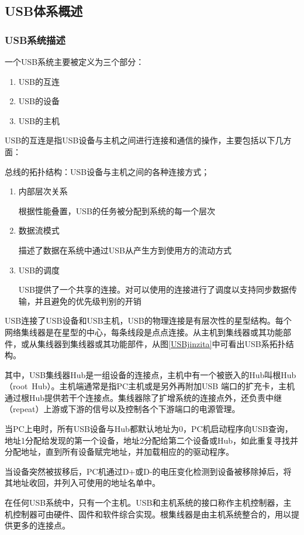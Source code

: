\subsection{USB体系概述}
\subsubsection{USB系统描述}
一个USB系统主要被定义为三个部分：
\begin{enumerate}
\item USB的互连
\item USB的设备
\item USB的主机
\end{enumerate}

USB的互连是指USB设备与主机之间进行连接和通信的操作，主要包括以下几方面： 

总线的拓扑结构：USB设备与主机之间的各种连接方式； 

\begin{enumerate}
\item 内部层次关系

根据性能叠置，USB的任务被分配到系统的每一个层次
\item 数据流模式

描述了数据在系统中通过USB从产生方到使用方的流动方式
\item USB的调度

USB提供了一个共享的连接。对可以使用的连接进行了调度以支持同步数据传输，并且避免的优先级判别的开销
\end{enumerate}

USB连接了USB设备和USB主机，USB的物理连接是有层次性的星型结构。每个网络集线器是在星型的中心，每条线段是点点连接。从主机到集线器或其功能部件，或从集线器到集线器或其功能部件，从图\ref{USBjinzita}中可看出USB系拓扑结构。

其中，USB集线器Hub是一组设备的连接点，主机中有一个被嵌入的Hub叫根Hub（root Hub）。主机端通常是指PC主机或是另外再附加USB 端口的扩充卡，主机通过根Hub提供若干个连接点。集线器除了扩增系统的连接点外，还负责中继（repeat）上游或下游的信号以及控制各个下游端口的电源管理。 

当PC上电时，所有USB设备与Hub都默认地址为0，PC机启动程序向USB查询，地址1分配给发现的第一个设备，地址2分配给第二个设备或Hub，如此重复寻找并分配地址，直到所有设备赋完地址，并加载相应的的驱动程序。 

当设备突然被拔移后，PC机通过D+或D-的电压变化检测到设备被移除掉后，将其地址收回，并列入可使用的地址名单中。 

在任何USB系统中，只有一个主机。USB和主机系统的接口称作主机控制器，主机控制器可由硬件、固件和软件综合实现。根集线器是由主机系统整合的，用以提供更多的连接点。 

